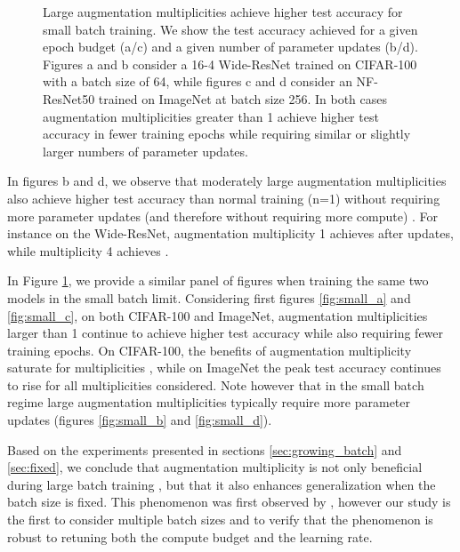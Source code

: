 \documentclass{article}
\begin{document}
\begin{figure}[t]
\centering
  \vskip -1mm
\vskip -2mm
\caption{Large augmentation multiplicities achieve higher test accuracy for small batch training. We show the test accuracy achieved for a given epoch budget (a/c) and a given number of parameter updates (b/d). Figures a and b consider a 16-4 Wide-ResNet trained on CIFAR-100 with a batch size of 64, while figures  c and d consider an NF-ResNet50 trained on ImageNet at batch size 256. In both cases augmentation multiplicities greater than 1 achieve higher test accuracy in fewer training epochs while requiring similar or slightly larger numbers of parameter updates.
}
\label{fig:small}
\vskip -2mm
\end{figure}


In figures b and d, we observe that moderately large augmentation multiplicities also achieve higher test accuracy than normal training (n=1) without requiring more parameter updates (and therefore without requiring more compute) \citep{berman2019multigrain}. For instance on the Wide-ResNet, augmentation multiplicity 1 achieves  after  updates, while multiplicity 4 achieves .

In Figure \ref{fig:small}, we provide a similar panel of figures when training the same two models in the small batch limit. Considering first figures \ref{fig:small_a} and \ref{fig:small_c}, on both CIFAR-100 and ImageNet, augmentation multiplicities larger than 1 continue to achieve higher test accuracy while also requiring fewer training epochs. On CIFAR-100, the benefits of augmentation multiplicity saturate for multiplicities , while on ImageNet the peak test accuracy continues to rise for all multiplicities considered. Note however that in the small batch regime large augmentation multiplicities typically require more parameter updates (figures \ref{fig:small_b} and \ref{fig:small_d}). 

Based on the experiments presented in sections \ref{sec:growing_batch} and \ref{sec:fixed}, we conclude that augmentation multiplicity is not only beneficial during large batch training \citep{hoffer2019augment}, but that it also enhances generalization when the batch size is fixed. This phenomenon was first observed by \citet{berman2019multigrain}, however our study is the first to consider multiple batch sizes and to verify that the phenomenon is robust to retuning both the compute budget and the learning rate.
\end{document}
